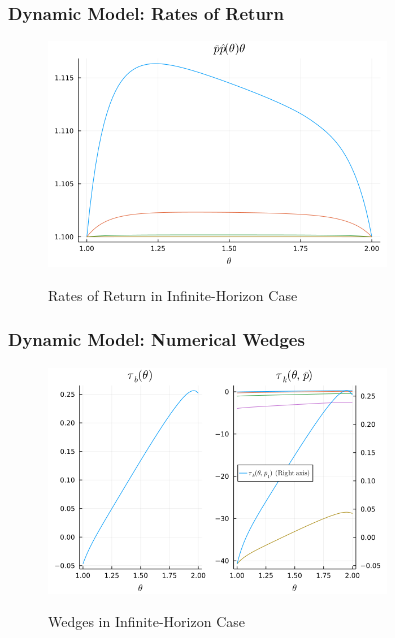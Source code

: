 \documentclass{beamer}
\begin{document}
\begin{frame}
    \frametitle{Dynamic Model: Rates of Return}

    \begin{figure}[htbp]
        \centering
        \caption{Rates of Return in Infinite-Horizon Case}
        \includegraphics[width = 0.8\textwidth]{figures/inf_rors_tnorm.png}
        \label{fig:inf_rors}
    \end{figure}

\end{frame}

\begin{frame}
    \frametitle{Dynamic Model: Numerical Wedges}

    \begin{figure}[htbp]
        \centering
        \caption{Wedges in Infinite-Horizon Case}
        \includegraphics[width = 0.8\textwidth]{figures/inf_wedges_norm.png}
        \label{fig:inf_wedges}
    \end{figure}

\end{frame}
\end{document}

